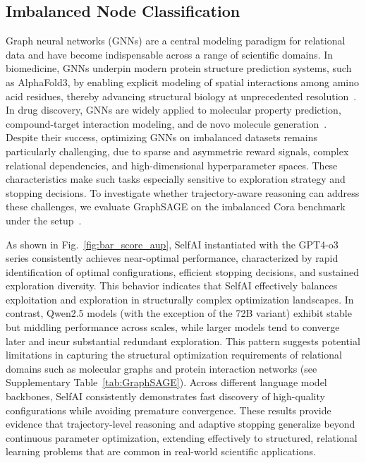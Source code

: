 \subsection{Imbalanced Node Classification}
Graph neural networks (GNNs) are a central modeling paradigm for relational data and have become indispensable across a range of scientific domains. In biomedicine, GNNs underpin modern protein structure prediction systems, such as AlphaFold3, by enabling explicit modeling of spatial interactions among amino acid residues, thereby advancing structural biology at unprecedented resolution~\cite{alphafold3}. In drug discovery, GNNs are widely applied to molecular property prediction, compound-target interaction modeling, and de novo molecule generation~\cite{bongini2021molecular}. Despite their success, optimizing GNNs on imbalanced datasets remains particularly challenging, due to sparse and asymmetric reward signals, complex relational dependencies, and high-dimensional hyperparameter spaces. These characteristics make such tasks especially sensitive to exploration strategy and stopping decisions. To investigate whether trajectory-aware reasoning can address these challenges, we evaluate GraphSAGE on the imbalanced Cora benchmark~\cite{zhao2021graphsmote} under the setup~\cite{yan2023unreal}.

As shown in Fig.~\ref{fig:bar_score_aup}, SelfAI instantiated with the GPT4-o3 series consistently achieves near-optimal performance, characterized by rapid identification of optimal configurations, efficient stopping decisions, and sustained exploration diversity. This behavior indicates that SelfAI effectively balances exploitation and exploration in structurally complex optimization landscapes. In contrast, Qwen2.5 models (with the exception of the 72B variant) exhibit stable but middling performance across scales, while larger models tend to converge later and incur substantial redundant exploration. This pattern suggests potential limitations in capturing the structural optimization requirements of relational domains such as molecular graphs and protein interaction networks (see Supplementary Table~\ref{tab:GraphSAGE}). Across different language model backbones, SelfAI consistently demonstrates fast discovery of high-quality configurations while avoiding premature convergence. These results provide evidence that trajectory-level reasoning and adaptive stopping generalize beyond continuous parameter optimization, extending effectively to structured, relational learning problems that are common in real-world scientific applications.

